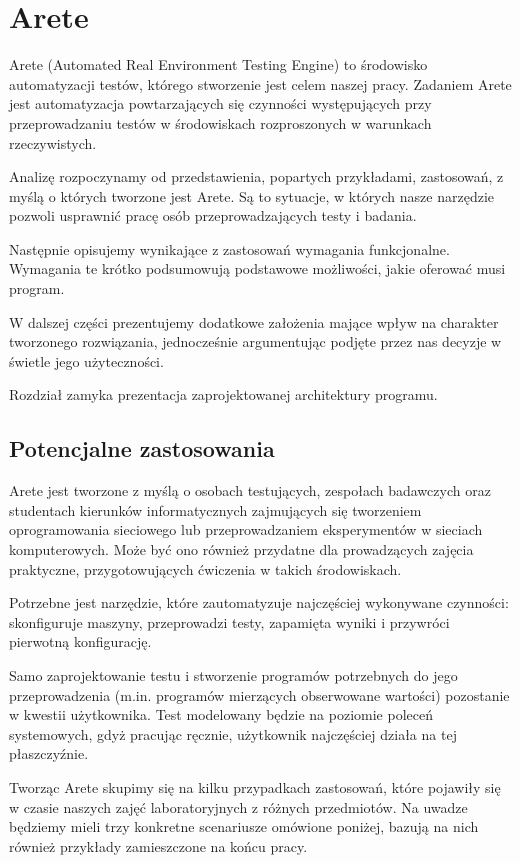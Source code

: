 \documentclass[00-praca-magisterska.tex]{subfiles}
\begin{document}
\chapter{Arete}
\label{arete}

Arete (Automated Real Environment Testing Engine) to środowisko automatyzacji
testów, którego stworzenie jest celem naszej pracy. Zadaniem Arete jest
automatyzacja powtarzających się czynności występujących przy przeprowadzaniu
testów w środowiskach rozproszonych w warunkach rzeczywistych.

Analizę rozpoczynamy od przedstawienia, popartych przykładami, zastosowań, z
myślą o których tworzone jest Arete. Są to sytuacje, w których nasze narzędzie
pozwoli usprawnić pracę osób przeprowadzających testy i badania.

Następnie opisujemy wynikające z zastosowań wymagania funkcjonalne. Wymagania
te krótko podsumowują podstawowe możliwości, jakie oferować musi program.

W dalszej części prezentujemy dodatkowe założenia mające wpływ na charakter
tworzonego rozwiązania, jednocześnie argumentując podjęte przez nas decyzje w
świetle jego użyteczności.

Rozdział zamyka prezentacja zaprojektowanej architektury programu.

\section{Potencjalne zastosowania}
\label{arete-zastosowania}

Arete jest tworzone z myślą o osobach testujących, zespołach badawczych oraz
studentach kierunków informatycznych zajmujących się tworzeniem oprogramowania
sieciowego lub przeprowadzaniem eksperymentów w sieciach komputerowych. Może
być ono również przydatne dla prowadzących zajęcia praktyczne, przygotowujących
ćwiczenia w takich środowiskach.

Potrzebne jest narzędzie, które zautomatyzuje najczęściej wykonywane
czynności: skonfiguruje maszyny, przeprowadzi testy, zapamięta wyniki i
przywróci pierwotną konfigurację.

Samo zaprojektowanie testu i stworzenie programów potrzebnych do jego
przeprowadzenia (m.in. programów mierzących obserwowane wartości) pozostanie w
kwestii użytkownika. Test modelowany będzie na poziomie poleceń systemowych,
gdyż pracując ręcznie, użytkownik najczęściej działa na tej płaszczyźnie.

Tworząc Arete skupimy się na kilku przypadkach zastosowań, które pojawiły się w
czasie naszych zajęć laboratoryjnych z różnych przedmiotów. Na uwadze będziemy
mieli trzy konkretne scenariusze omówione poniżej, bazują na nich również
przykłady zamieszczone na końcu pracy.
\end{document}
